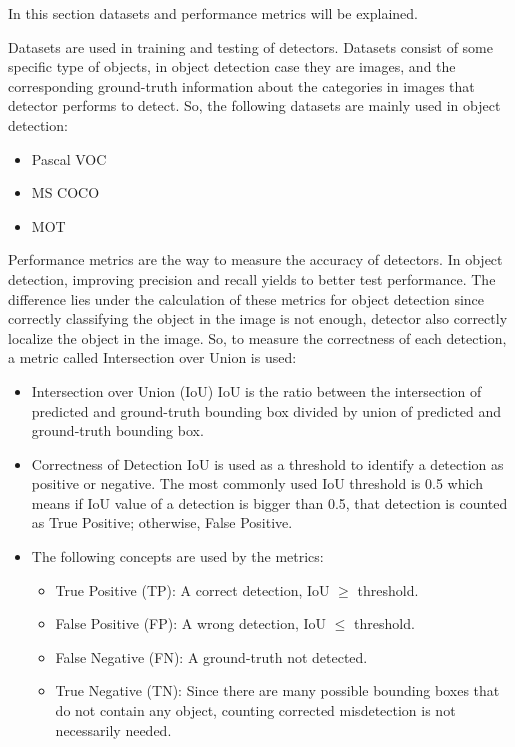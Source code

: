 \documentclass{article}
\begin{document}
\setlength{\parindent}{6ex}

\indent

In this section datasets and performance metrics will be explained. \par 
Datasets are used in training and testing of detectors. Datasets consist of some 
specific type of objects, in object detection case they are images, and the 
corresponding ground-truth information about the categories in images that 
detector performs to detect. So, the following datasets are mainly used in 
object detection:
\begin{itemize}
    \item Pascal VOC
    \item MS COCO
    \item MOT
\end{itemize} 

Performance metrics are the way to measure the accuracy of detectors. In object 
detection, improving precision and recall yields to better test performance. The 
difference lies under the calculation of these metrics for object detection since 
correctly classifying the object in the image is not enough, detector also correctly 
localize the object in the image. So, to measure the correctness of each detection, 
a metric called Intersection over Union is used:
\begin{itemize}
    \item Intersection over Union (IoU)
    IoU is the ratio between the intersection of predicted and ground-truth bounding box 
    divided by union of predicted and ground-truth bounding box. 
    \item Correctness of Detection
    IoU is used as a threshold to identify a detection as positive or negative. The 
    most commonly used IoU threshold is 0.5 which means if IoU value of a detection is 
    bigger than 0.5, that detection is counted as True Positive; otherwise, False Positive.
    \item The following concepts are used by the metrics:
    \begin{itemize}
        \item True Positive (TP): A correct detection, IoU $\geq$ threshold. 
        \item False Positive (FP): A wrong detection, IoU $\leq$ threshold.
        \item False Negative (FN): A ground-truth not detected.
        \item True Negative (TN): Since there are many possible bounding boxes that 
        do not contain any object, counting corrected misdetection is not necessarily 
        needed.
    \end{itemize}
    
\end{itemize}
\end{document}
